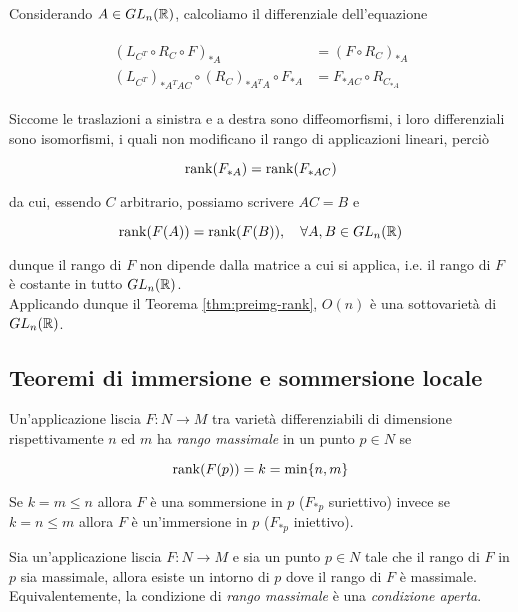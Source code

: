 Considerando $ A \in GL_{n}(\mathbb{R}) $, calcoliamo il differenziale dell'equazione

\begin{align}
	\begin{split}
		(L_{C^{T}} \circ R_{C} \circ F)_{*A} &= (F \circ R_{C})_{*A}\\
		(L_{C^{T}})_{*A^{T} A C} \circ (R_{C})_{*A^{T} A} \circ F_{*A} &= F_{*A C} \circ R_{C_{*A}}
	\end{split}
\end{align}

Siccome le traslazioni a sinistra e a destra sono diffeomorfismi, i loro differenziali sono isomorfismi, i quali non modificano il rango di applicazioni lineari, perciò

\begin{equation}
	\rank(F_{*A}) = \rank(F_{*A C})
\end{equation}

da cui, essendo $ C $ arbitrario, possiamo scrivere $ A C = B $ e

\begin{equation}
	\rank(F(A)) = \rank(F(B)) \qcomma \forall A,B \in GL_{n}(\R)
\end{equation}

dunque il rango di $ F $ non dipende dalla matrice a cui si applica, i.e. il rango di $ F $ è costante in tutto $ GL_{n}(\mathbb{R}) $.\\
Applicando dunque il Teorema \ref{thm:preimg-rank}, $ O(n) $ è una sottovarietà di $ GL_{n}(\mathbb{R}) $.

\subsection{Teoremi di immersione e sommersione locale}

Un'applicazione liscia $ F : N \to M $ tra varietà differenziabili di dimensione rispettivamente $ n $ ed $ m $ ha \textit{rango massimale} in un punto $ p \in N $ se

\begin{equation}
	\rank(F(p)) = k = \min\{n,m\}
\end{equation}

Se $ k = m \leqslant n $ allora $ F $ è una sommersione in $ p $ ($ F_{*p} $ suriettivo) invece se $ k = n \leqslant m $ allora $ F $ è un'immersione in $ p $ ($ F_{*p} $ iniettivo).

\begin{lemma}
	Sia un'applicazione liscia $ F : N \to M $ e sia un punto $ p \in N $ tale che il rango di $ F $ in $ p $ sia massimale, allora esiste un intorno di $ p $ dove il rango di $ F $ è massimale.\\
	Equivalentemente, la condizione di \textit{rango massimale} è una \textit{condizione aperta}.
\end{lemma}

